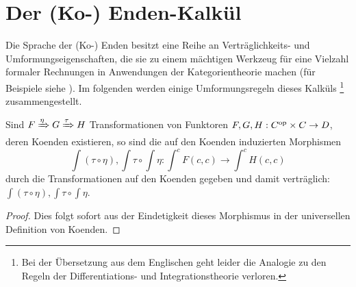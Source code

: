 \section{Der (Ko-) Enden-Kalkül}

Die Sprache der (Ko-) Enden besitzt eine Reihe an Verträglichkeits-
und Umformungseigenschaften, die sie zu einem mächtigen Werkzeug für
eine Vielzahl formaler Rechnungen in Anwendungen der Kategorientheorie
machen (für Beispiele siehe \cite{Lore}). Im folgenden werden einige
Umformungsregeln dieses Kalküls \footnote{Bei der Übersetzung
  aus dem Englischen geht leider die Analogie zu den Regeln der
  Differentiations- und Integrationstheorie verloren.}
zusammengestellt.

\begin{lemma}
  Sind $F \xRightarrow{\eta} G \xRightarrow{\tau} H$ Transformationen
  von Funktoren $F, G, H: C^\mathrm{op} \times C \to D$, deren Koenden
  existieren, so sind die auf den Koenden induzierten Morphismen
  \[ \int (\tau \circ \eta), \int \tau \circ \int \eta:
  \int^c F(c, c) \to \int^c H(c, c) \]
  durch die Transformationen auf den Koenden gegeben und damit
  verträglich: $\int (\tau \circ \eta), \int \tau \circ \int \eta$.
\end{lemma}
\begin{proof}
  Dies folgt sofort aus der Eindetigkeit dieses Morphismus in der
  universellen Definition von Koenden.
\end{proof}

